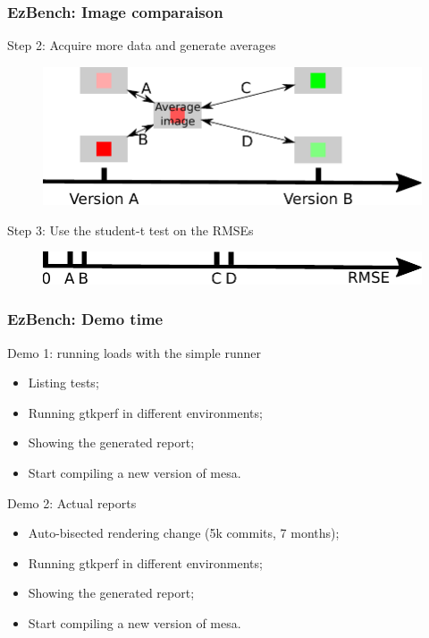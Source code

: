 \documentclass[11pt,english,compress]{beamer}
\begin{document}
\begin{frame}
	\frametitle{EzBench: Image comparaison}

	\begin{block}{Step 2: Acquire more data and generate averages}
		\begin{figure}%
			\centering
			\includegraphics[width=\textwidth]{img_diff_step_2.pdf}
		\end{figure}
	\end{block}
	
	\pause
	
	\begin{block}{Step 3: Use the student-t test on the RMSEs}
		\begin{figure}%
			\centering
			\includegraphics[width=\textwidth]{img_diff_step_3.pdf}
		\end{figure}
	\end{block}
\end{frame}

\begin{frame}
	\frametitle{EzBench: Demo time}

	\begin{block}{Demo 1: running loads with the simple runner}
		\begin{itemize}
			\item Listing tests;
			\item Running gtkperf in different environments;
			\item Showing the generated report;
			\item Start compiling a new version of mesa.
		\end{itemize}
	\end{block}
	
	\pause
	
	\begin{block}{Demo 2: Actual reports }
		\begin{itemize}
			\item Auto-bisected rendering change (5k commits, 7 months);
			\item Running gtkperf in different environments;
			\item Showing the generated report;
			\item Start compiling a new version of mesa.
		\end{itemize}
	\end{block}
\end{frame}
\end{document}
